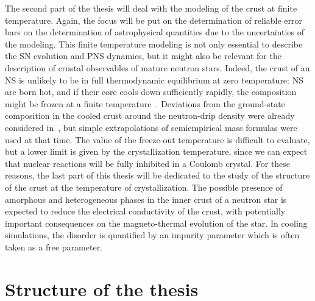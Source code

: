 The second part of the thesis will deal with the modeling of the crust at 
finite temperature. Again, the focus will be put on the determination of 
reliable error bars on the determination of astrophysical quantities due to the 
uncertainties of the modeling. This finite temperature modeling is not only 
essential to describe the SN evolution and PNS dynamics, but it might also be 
relevant for the description of crustal observables of mature neutron stars. 
Indeed, the crust of an NS is unlikely to be in full thermodynamic equilibrium 
at zero temperature: NS are born hot, and if their core cools 
down sufficiently rapidly, the composition might be frozen at a finite 
temperature~\cite{Goriely2011}. 
Deviations from the ground-state composition in the cooled crust around the 
neutron-drip density were already considered in~\cite{Bisnovaty1979}, but 
simple extrapolations of semiempirical mass formulas were used at that time. 
The value of the freeze-out temperature is difficult to evaluate, but a lower 
limit is given by the crystallization temperature, since we can expect that 
nuclear reactions will be fully inhibited in a Coulomb crystal. 
For these reasons, the last part of this thesis will be dedicated to the study 
of the structure of the crust at the temperature of crystallization. 
The possible presence of amorphous and heterogeneous phases in the inner crust 
of a neutron star is expected to reduce the electrical conductivity of the 
crust, with potentially important consequences on the magneto-thermal evolution 
of the star. In cooling simulations, the disorder is quantified by an impurity 
parameter which is often taken as a free parameter.

\section*{Structure of the thesis}

